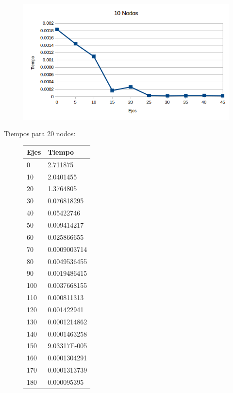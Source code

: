   \begin{figure}[h!]
   \begin{center}
 	\includegraphics[scale=0.7]{imagenes/exacto/10Nodos.png}
   \end{center}
 \end{figure}

\newpage
 Tiempos para 20 nodos: \\

  \begin{figure}[h!]
   \begin{center}
 \begin{tabular}{| l | l |}
 \hline
  Ejes & Tiempo \\ \hline
  0 & 2.711875 \\ \hline
  10 & 2.0401455 \\ \hline
  20 & 1.3764805 \\ \hline
  30 & 0.076818295 \\ \hline
  40 & 0.05422746 \\ \hline
  50 & 0.009414217 \\ \hline
  60 & 0.025866655 \\ \hline
  70 & 0.0009003714 \\ \hline
  80 & 0.0049536455 \\ \hline
  90 & 0.0019486415 \\ \hline
  100 & 0.0037668155 \\ \hline
  110 & 0.000811313 \\ \hline
  120 & 0.001422941 \\ \hline
  130 & 0.0001214862 \\ \hline
  140 & 0.0001463258 \\ \hline
  150 & 9.03317E-005 \\ \hline
  160 & 0.0001304291 \\ \hline
  170 & 0.0001313739 \\ \hline
  180 & 0.000095395 \\ \hline
 \end{tabular}
   \end{center}
 \end{figure}

